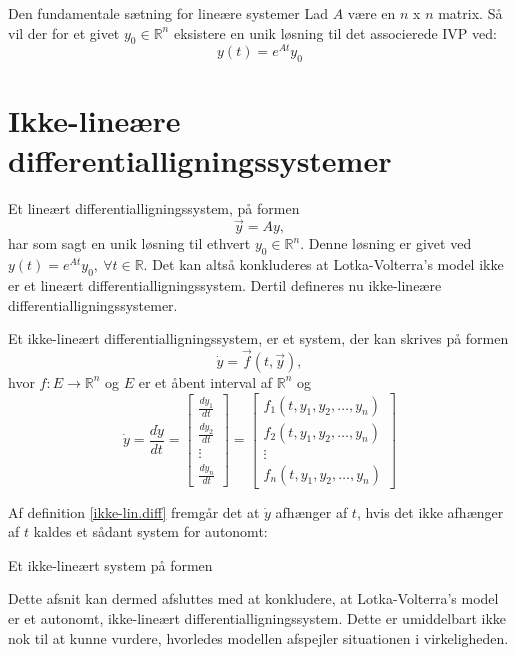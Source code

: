 \begin{mytheo}{Den fundamentale sætning for lineære systemer}{}
Lad $A$ være en $n$ x $n$ matrix. Så vil der for et givet $y_0 \in \mathbb{R}^n$ eksistere en unik løsning til det associerede IVP ved:
$$y(t) = e^{At}y_0$$
\end{mytheo}

\section{Ikke-lineære differentialligningssystemer}

Et lineært differentialligningssystem, på formen $$\vec{y}=Ay,$$ har som sagt en unik løsning til ethvert $y_0 \in \mathbb{R}^n$. Denne løsning er givet ved $y(t)=e^{At}y_0, \ \forall t \in \mathbb{R}$. Det kan altså konkluderes at Lotka-Volterra's model ikke er et lineært differentialligningssystem. Dertil defineres nu ikke-lineære differentialligningssystemer.

\begin{definition} \label{ikke-lin.diff}
Et ikke-lineært differentialligningssystem, er et system, der kan skrives på formen
$$\dot{y}=\vec{f}(t, \vec{y}),$$
hvor $f: E \to \mathbb{R}^n$ og $E$ er et åbent interval af $\mathbb{R}^n$ og
$$\dot{y} = \frac{d\dot{y}}{dt} = 
\begin{bmatrix}
\frac{dy_1}{dt} \\
\frac{dy_2}{dt}\\
\vdots \\
\frac{dy_n}{dt}
\end{bmatrix}
=
\begin{bmatrix}
f_1(t, y_1, y_2, \hdots, y_n)\\
f_2(t, y_1, y_2, \hdots, y_n)\\
\vdots \\
f_n(t, y_1, y_2, \hdots, y_n)
\end{bmatrix}$$
\end{definition}

Af definition \ref{ikke-lin.diff} fremgår det at $\dot{y}$ afhænger af $t$, hvis det ikke afhænger af $t$ kaldes et sådant system for autonomt:
\begin{definition}
Et ikke-lineært system på formen
$$$$
\end{definition}

Dette afsnit kan dermed afsluttes med at konkludere, at Lotka-Volterra's model er et autonomt, ikke-lineært differentialligningssystem. Dette er umiddelbart ikke nok til at kunne vurdere, hvorledes modellen afspejler situationen i virkeligheden.